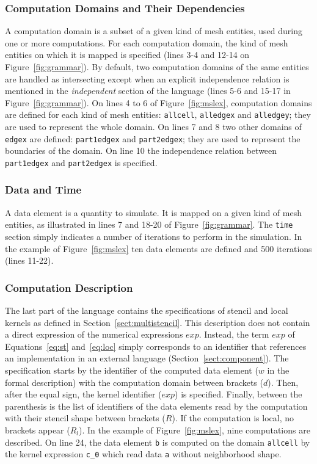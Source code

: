 \subsubsection*{Computation Domains and Their Dependencies}
A computation domain is a subset of a given kind of mesh entities, used during one or more computations.
For each computation domain, the kind of mesh entities on which it is mapped is specified (lines 3-4 and 12-14 on Figure~\ref{fig:grammar}).
By default, two computation domains of the same entities are handled as intersecting except when an explicit independence relation is mentioned in the \emph{independent} section of the language (lines 5-6 and 15-17 in Figure~\ref{fig:grammar}).
On lines 4 to 6 of Figure~\ref{fig:mslex}, computation domains are defined for each kind of mesh entities: \texttt{allcell}, \texttt{alledgex} and \texttt{alledgey}; they are used to represent the whole domain.
On lines 7 and 8 two other domains of \texttt{edgex} are defined: \texttt{part1edgex} and \texttt{part2edgex}; they are used to represent the boundaries of the domain.
On line 10 the independence relation between \texttt{part1edgex} and \texttt{part2edgex} is specified.

\subsubsection*{Data and Time}
A data element is a quantity to simulate. It is mapped on a given kind of mesh entities, as illustrated in lines 7 and 18-20 of Figure~\ref{fig:grammar}. The \texttt{time} section simply indicates a number of iterations to perform in the simulation. In the example of Figure~\ref{fig:mslex} ten data elements are defined and 500 iterations (lines 11-22). %


\subsubsection*{Computation Description}
The last part of the language contains the specifications of stencil and local kernels as defined in Section~\ref{sect:multistencil}.
This description does not contain a direct expression of the numerical expressions $exp$.
Instead, the term $exp$ of Equations~\ref{eq:st} and~\ref{eq:loc} simply corresponds to an identifier that references an implementation in an external language  (\cf Section~\ref{sect:component}).
The specification starts by the identifier of the computed data element ($w$ in the formal description) with the computation domain between brackets ($d$).
Then, after the equal sign, the kernel identifier ($exp$) is specified.
Finally, between the parenthesis is the list of identifiers of the data elements read by the computation with their stencil shape between brackets ($R$).
If the computation is local, no brackets appear ($R_l$). In the example of Figure~\ref{fig:mslex}, nine computations are described. On line 24, the data element \texttt{b} is computed on the domain \texttt{allcell} by the kernel expression \texttt{c\_0} which read data \texttt{a} without neighborhood shape.

